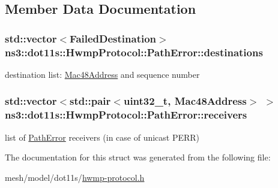 \subsection{Member Data Documentation}
\subsubsection[{\texorpdfstring{destinations}{destinations}}]{\setlength{\rightskip}{0pt plus 5cm}std\+::vector$<${\bf Failed\+Destination}$>$ ns3\+::dot11s\+::\+Hwmp\+Protocol\+::\+Path\+Error\+::destinations}\hypertarget{structns3_1_1dot11s_1_1HwmpProtocol_1_1PathError_a3463ead3153e4a0cb3138e01257ca28a}{}\label{structns3_1_1dot11s_1_1HwmpProtocol_1_1PathError_a3463ead3153e4a0cb3138e01257ca28a}


destination list\+: \hyperlink{classns3_1_1Mac48Address}{Mac48\+Address} and sequence number 

\subsubsection[{\texorpdfstring{receivers}{receivers}}]{\setlength{\rightskip}{0pt plus 5cm}std\+::vector$<$std\+::pair$<$uint32\+\_\+t, {\bf Mac48\+Address}$>$ $>$ ns3\+::dot11s\+::\+Hwmp\+Protocol\+::\+Path\+Error\+::receivers}\hypertarget{structns3_1_1dot11s_1_1HwmpProtocol_1_1PathError_a7c6bbe47fe916cd4e4fb179243cf8ccb}{}\label{structns3_1_1dot11s_1_1HwmpProtocol_1_1PathError_a7c6bbe47fe916cd4e4fb179243cf8ccb}


list of \hyperlink{structns3_1_1dot11s_1_1HwmpProtocol_1_1PathError}{Path\+Error} receivers (in case of unicast P\+E\+RR) 



The documentation for this struct was generated from the following file\+:\begin{DoxyCompactItemize}
\item 
mesh/model/dot11s/\hyperlink{hwmp-protocol_8h}{hwmp-\/protocol.\+h}\end{DoxyCompactItemize}
